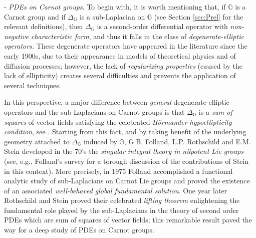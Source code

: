 \documentclass[11pt]{amsart}
\numberwithin{equation}{section} %
\theoremstyle{definition}
\begin{document}
\noindent -\,\,\emph{PDEs on Carnot groups}. To begin with, it is worth mentioning that, if $\mathbb{G}$ is a Carnot group and if $\Delta_\mathbb{G}$ is a sub-Lapla\-cian on $\mathbb{G}$ 
(see Section \ref{sec:Prel} for the relevant definitions), then $\Delta_\mathbb{G}$ is a second-order differential operator with 
\emph{non-negative characteristic form}, and thus it falls in the class of 
\emph{degenerate-elliptic operators.}
These degenerate operators
have appeared in the literature since the early 1900s, due to their appearance
in  models of theoretical physics and of diffusion processes; however,
the lack of \emph{regularizing properties} (caused by the lack of ellipticity) 
creates several difficulties and prevents the application of several techniques.

In this perspective, a major difference between \emph{general}
degenerate-elliptic operators and the sub-Laplacians on Carnot groups
is that $\Delta_\mathbb{G}$
is a \emph{sum of squares} of vector fields satisfying 
the celebrated 
{\em H\"{o}rmander hypoellipticity condition}, see \cite{Hormander}.
Starting from this fact, and by taking benefit of the underlying geometry
attached to $\Delta_\mathbb{G}$ induced by $\mathbb{G}$, 
G.B. Folland, L.P. Rothschild and E.M. Stein developed in the 70's the 
\emph{singular integral theory in nilpotent Lie
groups} (see, e.g., Folland's survey
\cite{Folland_per_Stein} for a torough discussion of the contributions
of Stein in this context). More precisely, in 1975  Folland \cite{Folland} 
accomplished a functional
analytic study of sub-Laplacians on Carnot Lie groups and proved
the existence of an associated \emph{well-behaved global fundamental solution}.
One year later
Rothschild and Stein \cite{RotSte} proved their celebrated 
\emph{lifting theorem}
enlightening the fundamental role played by the sub-Laplacians in the theory of second order PDEs which are sum of squares of vector fields; this remarkable result paved the way for a deep study of PDEs on Carnot groups.
\vspace{0.1cm}
\end{document}
